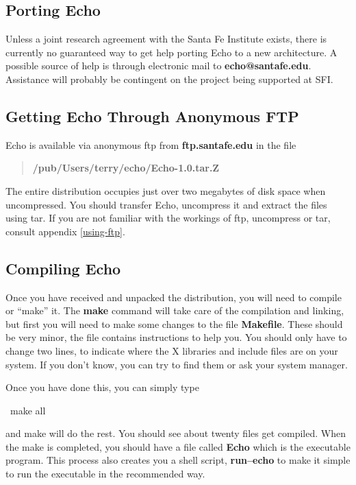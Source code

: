 \subsection{Porting Echo}

Unless a joint research agreement with the Santa Fe Institute exists,
there is currently no guaranteed way to get help porting Echo to a new
architecture. A possible source of help is through electronic mail to
{\bf echo@santafe.edu}. Assistance will probably be contingent on the
project being supported at SFI.

\subsection{Getting Echo Through Anonymous FTP}

Echo is available via anonymous ftp from {\bf ftp.santafe.edu} in the
file

\begin{verse}
{\bf /pub/Users/terry/echo/Echo-1.0.tar.Z}
\end{verse}

The entire distribution occupies just over two megabytes of disk
space when uncompressed. You should transfer Echo, uncompress
 it and
extract the files using tar.  If you are not familiar with
the workings of ftp, uncompress or tar, consult appendix
\ref{using-ftp}.


\subsection{Compiling Echo}

Once you have received and unpacked the distribution, you will need to
compile or ``make'' it. The {\bf make} command will
take care of the compilation and linking, but first you will need to
make some changes to the file {\bf Makefile}. These should be very
minor, the file contains instructions to help you. You should only
have to change two lines, to indicate where the X libraries and
include files are on your system. If you don't know, you can try to
find them or ask your system manager.

Once you have done this, you can simply type

\begin{shell}
\prompt\ make all
\end{shell}

and make will do the rest. You should see about twenty files get
compiled.  When the make is completed, you should have a file called
{\bf Echo} which is the executable program. This process also creates
you a shell script, {\bf run--echo} to make it simple to run the
executable in the recommended way.

